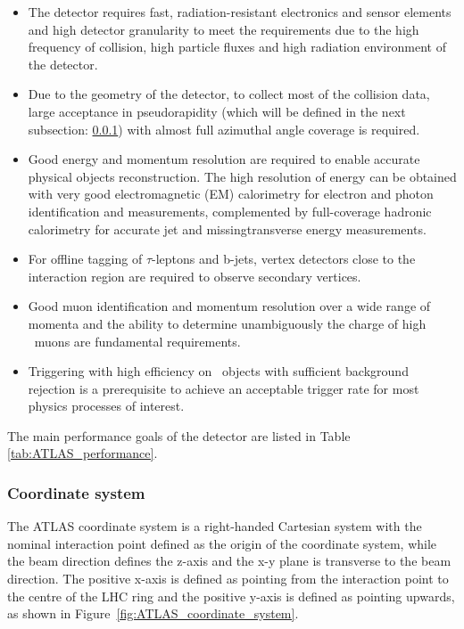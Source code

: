 \begin{itemize}
\item
The detector requires fast, radiation-resistant  
electronics and sensor elements and high detector granularity
to meet the requirements due to the high frequency of collision,
high particle fluxes and high radiation environment of the
detector.


\item
Due to the geometry of the detector, to collect most of the 
collision data, large acceptance in pseudorapidity (which will be defined
in the next subsection: \ref{sec:detector coordinate}) 
with almost full azimuthal angle coverage is required.


\item
Good energy and momentum resolution are required to 
enable accurate physical objects reconstruction. 
The high resolution of energy can be obtained 
with very good electromagnetic (EM) calorimetry for 
electron and photon identification and measurements,
complemented by full-coverage hadronic calorimetry 
for accurate jet and missingtransverse energy measurements.


\item
For offline tagging of $\tau$-leptons and b-jets, vertex 
detectors close to the interaction region are 
required to observe secondary vertices.


\item
Good muon identification and momentum resolution 
over a wide range of momenta and the ability 
to determine unambiguously the charge of high 
\pt\ muons are fundamental requirements.


\item

Triggering with high efficiency on \pt\  
objects with sufficient background rejection is a 
prerequisite to achieve an acceptable trigger rate 
for most physics processes of interest.
\end{itemize}


The main performance goals of the detector are 
listed in Table \ref{tab:ATLAS_performance}. 


\subsubsection{Coordinate system}
	\label{sec:detector coordinate}



	The ATLAS coordinate system is a right-handed Cartesian system
	with the nominal interaction point 
	defined as the origin of the coordinate system,  
	while the beam direction defines the z-axis and 
	the x-y plane is transverse to the beam direction.  
	The positive x-axis is defined as pointing from 
	the interaction point to the centre of the
	LHC ring and the positive y-axis is defined as 
	pointing upwards, as shown in Figure~\ref{fig:ATLAS_coordinate_system}. 

